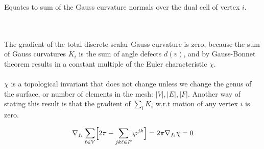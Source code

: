 \documentclass{article}
\begin{document}
Equates to sum of the Gauss curvature normals over the dual cell of vertex $i$.


\vspace{1.8cm}
\\\\


The gradient of the total discrete scalar Gauss curvature is zero, because the sum of Gauss curvatures $K_i$ is 
the sum of angle defects $d(v)$, and by Gauss-Bonnet theorem results in a constant multiple of the Euler characteristic $\chi$.\\\\
$\chi$ is a topological invariant that does not change unless we change the genus of the surface,
or number of elements in the mesh: $|V|, |E|, |F|$. 
Another way of stating this result is that the gradient of $\sum_i K_i$ w.r.t motion of any vertex $i$ is zero.

$$
\nabla_{f_i} \sum_{\ell \in V} \Bigl[2\pi - \sum_{jk\ell \in F} \varphi^{jk}\Bigr]
= 2\pi \nabla_{f_i}\chi
= 0
$$    
\end{document}
